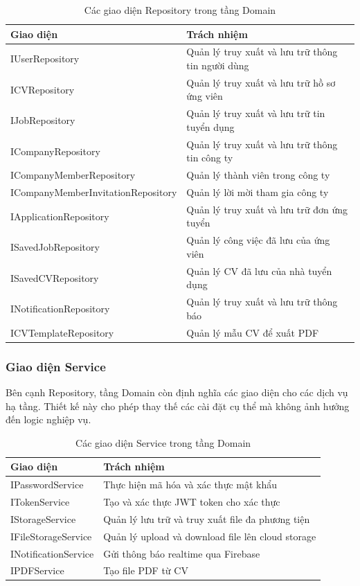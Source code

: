 \begin{table}[H]
\centering
\caption{Các giao diện Repository trong tầng Domain}
\label{tab:repository-interfaces}
\begin{tabular}{|p{5cm}|p{7cm}|}
\hline
\textbf{Giao diện} & \textbf{Trách nhiệm} \\
\hline
IUserRepository & Quản lý truy xuất và lưu trữ thông tin người dùng \\
\hline
ICVRepository & Quản lý truy xuất và lưu trữ hồ sơ ứng viên \\
\hline
IJobRepository & Quản lý truy xuất và lưu trữ tin tuyển dụng \\
\hline
ICompanyRepository & Quản lý truy xuất và lưu trữ thông tin công ty \\
\hline
ICompanyMemberRepository & Quản lý thành viên trong công ty \\
\hline
ICompanyMemberInvitationRepository & Quản lý lời mời tham gia công ty \\
\hline
IApplicationRepository & Quản lý truy xuất và lưu trữ đơn ứng tuyển \\
\hline
ISavedJobRepository & Quản lý công việc đã lưu của ứng viên \\
\hline
ISavedCVRepository & Quản lý CV đã lưu của nhà tuyển dụng \\
\hline
INotificationRepository & Quản lý truy xuất và lưu trữ thông báo \\
\hline
ICVTemplateRepository & Quản lý mẫu CV để xuất PDF \\
\hline
\end{tabular}
\end{table}

\subsubsection{Giao diện Service}

Bên cạnh Repository, tầng Domain còn định nghĩa các giao diện cho các dịch vụ hạ tầng. Thiết kế này cho phép thay thế các cài đặt cụ thể mà không ảnh hưởng đến logic nghiệp vụ.

\begin{table}[H]
\centering
\caption{Các giao diện Service trong tầng Domain}
\label{tab:service-interfaces}
\begin{tabular}{|p{4cm}|p{8cm}|}
\hline
\textbf{Giao diện} & \textbf{Trách nhiệm} \\
\hline
IPasswordService & Thực hiện mã hóa và xác thực mật khẩu \\
\hline
ITokenService & Tạo và xác thực JWT token cho xác thực \\
\hline
IStorageService & Quản lý lưu trữ và truy xuất file đa phương tiện \\
\hline
IFileStorageService & Quản lý upload và download file lên cloud storage \\
\hline
INotificationService & Gửi thông báo realtime qua Firebase \\
\hline
IPDFService & Tạo file PDF từ CV \\
\hline
\end{tabular}
\end{table}

